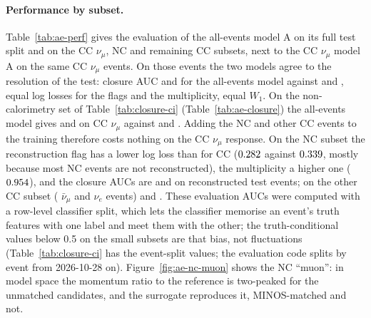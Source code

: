 \documentclass[11pt]{article}
\begin{document}
\paragraph{Performance by subset.} Table~\ref{tab:ae-perf} gives the evaluation of the all-events model A on its
full test split and on the CC $\nu_\mu$, NC and remaining CC subsets, next to the CC $\nu_\mu$ model A on the same
CC $\nu_\mu$ events. On those events the two models agree to the resolution of the test: closure AUC
\nAEAUCmargAllCC{} and \nAEAUCcondAllCC{} for the all-events model against \nAEAUCmargCCModel{} and
\nAEAUCcondCCModel{}, equal log losses for the flags and the multiplicity, equal $W_1$. On the non-calorimetry
set of Table~\ref{tab:closure-ci} (Table~\ref{tab:ae-closure}) the all-events model gives \nAECLACCCIMarg{} and
\nAECLACCCICond{} on CC $\nu_\mu$ against \nCLAFullCIMarg{} and \nCLAFullCICond{}. Adding the NC and other CC events to the training therefore costs nothing on the CC $\nu_\mu$ response. On the NC subset the
reconstruction flag has a lower log loss than for CC ($0.282$ against $0.339$, mostly because
most NC events are not reconstructed), the multiplicity a higher one ($0.954$), and the closure AUCs are
\nAEAUCmargAllNC{} and \nAEAUCcondAllNC{} on \nAETestRecoNC{} reconstructed test events; on the other CC subset
(\nAETestRecoCCnumubar{} $\bar\nu_\mu$ and \nAETestRecoCCnue{} $\nu_e$ events) \nAEAUCmargAllOther{} and
\nAEAUCcondAllOther{}. These evaluation AUCs were computed with a row-level classifier split, which lets the
classifier memorise an event's truth features with one label and meet them with the other; the truth-conditional
values below 0.5 on the small subsets are that bias, not fluctuations (Table~\ref{tab:closure-ci} has the event-split
values; the evaluation code splits by event from 2026-10-28 on). Figure~\ref{fig:ae-nc-muon} shows the NC ``muon'': in model space the
momentum ratio to the reference is two-peaked for the unmatched candidates, and the surrogate reproduces it,
MINOS-matched and not.

\begin{table}[h]\centering\small
\resizebox{\textwidth}{!}{}
\caption{CC $\nu_\mu$ model A on its CC $\nu_\mu$ test split, and all-events model A on the CC $\nu_\mu$, NC,
other (CC $\bar\nu_\mu$, $\nu_e$, $\bar\nu_e$) and full test splits: event counts, log losses of the binary and
multiplicity heads, closure AUCs (overall and per block, truth-conditional) and $W_1$ in model space. The prong
row gives the AUC on the prong summaries alone and with the truth features.}
\label{tab:ae-perf}
\end{table}
\end{document}
